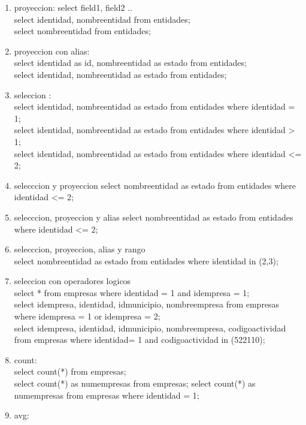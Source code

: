 \documentclass[10pt]{article}         %
\begin{document}
\begin{enumerate}

\item proyeccion:  select field1, field2 .. \\
	select identidad, nombreentidad from entidades; \\
	select nombreentidad from entidades;

\item proyeccion con alias: \\
 	select identidad as id, nombreentidad as estado from entidades; \\
 	select identidad, nombreentidad as estado from entidades;
 	
\item seleccion : \\
	select identidad, nombreentidad as estado from entidades where identidad = 1; \\
	select identidad, nombreentidad as estado from entidades where identidad > 1; \\
	select identidad, nombreentidad as estado from entidades where identidad <= 2; \\
\item selecccion y proyeccion
	select nombreentidad as estado from entidades where identidad <= 2; \\
\item selecccion, proyeccion y alias
	select nombreentidad as estado from entidades where identidad <= 2; \\
\item selecccion, proyeccion, alias y rango \\
	select nombreentidad as estado from entidades where identidad in (2,3);	
\item seleccion con operadores logicos \\
	select * from empresas where identidad = 1 and idempresa = 1; \\
	select idempresa, identidad, idmunicipio, nombreempresa  from empresas where idempresa = 1 or idempresa = 2; \\
	select idempresa, identidad, idmunicipio, nombreempresa, codigoactividad  from empresas where identidad= 1 and codigoactividad in (522110);
\item count: \\
	select count(*) from empresas; \\
	select count(*) as numempresas from empresas; 
	select count(*) as numempresas from empresas where identidad = 1;
\item avg: \\

\end{enumerate}
\end{document}
